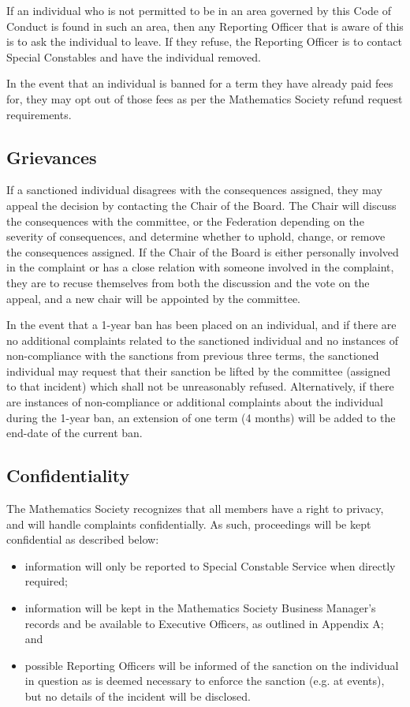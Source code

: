 If an individual who is not permitted to be in an area governed by this Code of Conduct is found in such an area, then any Reporting Officer that is aware of this is to ask the individual to leave. If they refuse, the Reporting Officer is to contact Special Constables and have the individual removed. 

In the event that an individual is banned for a term they have already paid fees for, they may opt out of those fees as per the Mathematics Society refund request requirements.

\subsection{Grievances}
If a sanctioned individual disagrees with the consequences assigned, they may appeal the decision by contacting the Chair of the Board. The Chair will discuss the consequences with the committee, or the Federation depending on the severity of consequences, and determine whether to uphold, change, or remove the consequences assigned. If the Chair of the Board is either personally involved in the complaint or has a close relation with someone involved in the complaint, they are to recuse themselves from both the discussion and the vote on the appeal, and a new chair will be appointed by the committee.

In the event that a 1-year ban has been placed on an individual, and if there are no additional complaints related to the sanctioned individual and no instances of non-compliance with the sanctions from previous three terms, the sanctioned individual may request that their sanction be lifted by the committee (assigned to that incident) which shall not be unreasonably refused. Alternatively, if there are instances of non-compliance or additional complaints about the individual during the 1-year ban, an extension of one term (4 months) will be added to the end-date of the current ban.

\subsection{Confidentiality}
The Mathematics Society recognizes that all members have a right to privacy, and will handle complaints confidentially. As such, proceedings will be kept confidential as described below:
\begin{itemize}
	\item information will only be reported to Special Constable Service when directly required;
	\item information will be kept in the Mathematics Society Business Manager's records and be available to Executive Officers, as outlined in Appendix A; and
	\item possible Reporting Officers will be informed of the sanction on the individual in question as is deemed necessary to enforce the sanction (e.g. at events), but no details of the incident will be disclosed.
\end{itemize}

